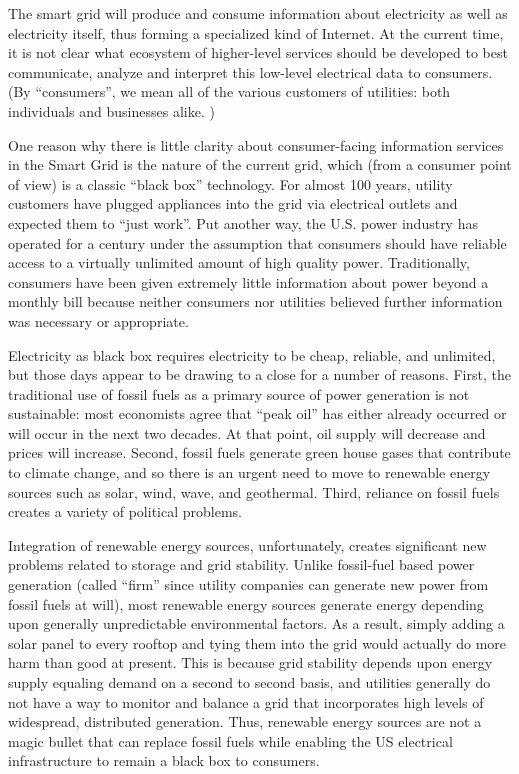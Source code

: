The smart grid will produce and consume information about electricity as
well as electricity itself, thus forming a specialized kind of Internet. At
the current time, it is not clear what ecosystem of higher-level services
should be developed to best communicate, analyze and interpret this
low-level electrical data to consumers.  (By ``consumers'', we mean all of
the various customers of utilities: both individuals and businesses
alike. )

One reason why there is little clarity about consumer-facing information
services in the Smart Grid is the nature of the current grid, which (from a
consumer point of view) is a classic ``black box'' technology.  For almost
100 years, utility customers have plugged appliances into the grid via
electrical outlets and expected them to ``just work''.  Put another way,
the U.S. power industry has operated for a century under the assumption
that consumers should have reliable access to a virtually unlimited amount
of high quality power.  Traditionally, consumers have been given extremely
little information about power beyond a monthly bill because neither
consumers nor utilities believed further information was necessary or
appropriate.

Electricity as black box requires electricity to be cheap, reliable, and
unlimited, but those days appear to be drawing to a close for a number of
reasons.  First, the traditional use of fossil fuels as a primary source of
power generation is not sustainable: most economists agree that ``peak
oil'' has either already occurred or will occur in the next two decades. At
that point, oil supply will decrease and prices will increase.  Second,
fossil fuels generate green house gases that contribute to climate change,
and so there is an urgent need to move to renewable energy sources such as
solar, wind, wave, and geothermal.  Third, reliance on fossil fuels creates
a variety of political problems.

Integration of renewable energy sources, unfortunately, creates significant
new problems related to storage and grid stability.  Unlike fossil-fuel
based power generation (called ``firm'' since utility companies can
generate new power from fossil fuels at will), most renewable energy
sources generate energy depending upon generally unpredictable
environmental factors.  As a result, simply adding a solar panel to every
rooftop and tying them into the grid would actually do more harm than good
at present.  This is because grid stability depends upon energy supply
equaling demand on a second to second basis, and utilities generally do not
have a way to monitor and balance a grid that incorporates high levels of
widespread, distributed generation. Thus, renewable energy sources are not
a magic bullet that can replace fossil fuels while enabling the US
electrical infrastructure to remain a black box to consumers.

